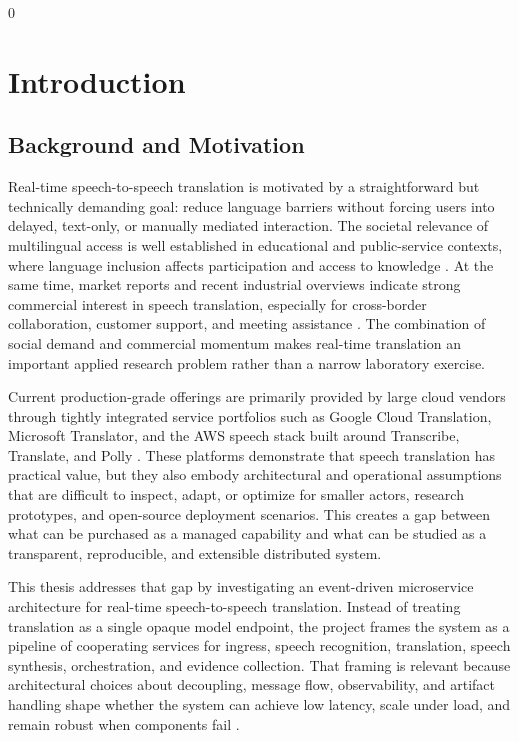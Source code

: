 0%
\chapter{Introduction}
\label{chap:introduction}

\section{Background and Motivation}
\label{sec:background-motivation}

Real-time speech-to-speech translation is motivated by a straightforward but technically demanding goal: reduce language barriers without forcing users into delayed, text-only, or manually mediated interaction. The societal relevance of multilingual access is well established in educational and public-service contexts, where language inclusion affects participation and access to knowledge \cite{unesco2022inclusion}. At the same time, market reports and recent industrial overviews indicate strong commercial interest in speech translation, especially for cross-border collaboration, customer support, and meeting assistance \cite{mordor2024speech,kudo2024stats}. The combination of social demand and commercial momentum makes real-time translation an important applied research problem rather than a narrow laboratory exercise.

Current production-grade offerings are primarily provided by large cloud vendors through tightly integrated service portfolios such as Google Cloud Translation, Microsoft Translator, and the AWS speech stack built around Transcribe, Translate, and Polly \cite{google_cloud_translate,microsoft_translator,aws_transcribe,aws_translate,aws_polly}. These platforms demonstrate that speech translation has practical value, but they also embody architectural and operational assumptions that are difficult to inspect, adapt, or optimize for smaller actors, research prototypes, and open-source deployment scenarios. This creates a gap between what can be purchased as a managed capability and what can be studied as a transparent, reproducible, and extensible distributed system.

This thesis addresses that gap by investigating an event-driven microservice architecture for real-time speech-to-speech translation. Instead of treating translation as a single opaque model endpoint, the project frames the system as a pipeline of cooperating services for ingress, speech recognition, translation, speech synthesis, orchestration, and evidence collection. That framing is relevant because architectural choices about decoupling, message flow, observability, and artifact handling shape whether the system can achieve low latency, scale under load, and remain robust when components fail \cite{newman2019monolith,richardson2018microservices,bass2021softwarearchitectureinpractice}.

